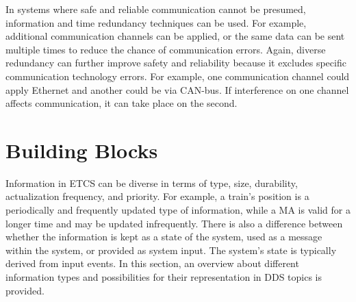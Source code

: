 In systems where safe and reliable communication cannot be presumed, information and time redundancy techniques can be used.
For example, additional communication channels can be applied, or the same data can be sent multiple times to reduce the chance of communication errors.
Again, diverse redundancy can further improve safety and reliability because it excludes specific communication technology errors.
For example, one communication channel could apply Ethernet and another could be via CAN-bus.
If interference on one channel affects communication, it can take place on the second.
\section{ Building Blocks}

Information in \gls*{ETCS} can be diverse in terms of type, size, durability, actualization frequency, and priority.
For example, a train's position is a periodically and frequently updated type of information, while a \gls*{MA} is valid for a longer time and may be updated infrequently.
There is also a difference between whether the information is kept as a state of the system, used as a message within the system, or provided as system input.
The system's state is typically derived from input events.
In this section, an overview about different information types and possibilities for their representation in \gls*{DDS} topics is provided.

